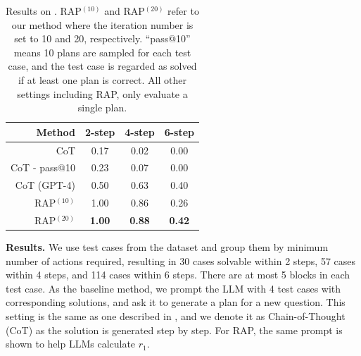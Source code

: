 


\begin{table}[t!]
    \small
    \centering
    \begin{tabular}{r c c c}
        \toprule
        \textbf{Method} & \textbf{2-step} & \textbf{4-step} & \textbf{6-step}\\
        \midrule
        CoT & 0.17 & 0.02 & 0.00\\
        CoT - pass@10 & 0.23 & 0.07 & 0.00 \\ 
        CoT (GPT-4) & 0.50  & 0.63 & 0.40\\
        
        \midrule
        RAP$^{(10)}$ & 1.00 & 0.86 & 0.26 \\
        RAP$^{(20)}$ & \textbf{1.00} & \textbf{0.88} & \textbf{0.42} \\
        \bottomrule
    \end{tabular}
    \vspace{-5pt}
    \caption{Results on \blocksworld. RAP$^{(10)}$ and RAP$^{(20)}$ refer to our method where the iteration number is set to 10 and 20, respectively. ``pass@10'' means 10 plans are sampled for each test case, and the test case is regarded as solved if at least one plan is correct. All other settings including RAP, only evaluate a single plan.}
    \label{tab:bw}
    \vspace{-12pt}
\end{table}


\noindent \textbf{Results.}
We use test cases from the \blocksworld dataset \cite{valmeekam2023planning} and group them by minimum number of actions required, resulting in 30 cases solvable within 2 steps, 57 cases within 4 steps, and 114 cases within 6 steps.
There are at most 5 blocks in each test case. As the baseline method, we prompt the LLM with 4 test cases with corresponding solutions, and ask it to generate a plan for a new question. This setting is the same as one described in \citet{valmeekam2022large}, and we denote it as Chain-of-Thought (CoT) as the solution is generated step by step. For RAP, the same prompt is shown to help LLMs calculate $r_1$. 

